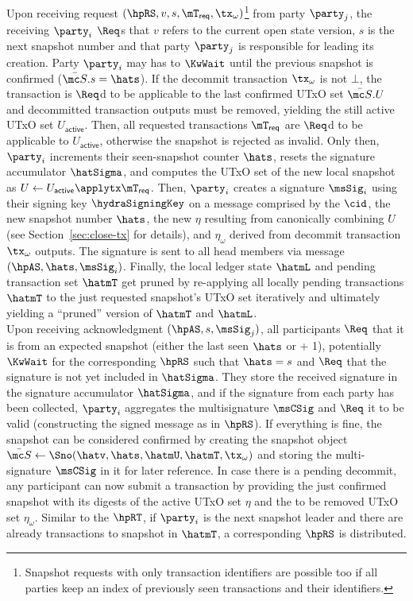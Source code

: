 \quad Upon receiving request
$(\hpRS,v,s,\mT_{\mathsf{req}}, \tx_{\omega})$\footnote{Snapshot requests
	with only transaction identifiers are possible too if all parties keep an
	index of previously seen transactions and their identifiers.} from party
$\party_j$, the receiving $\party_i$ $\Req$s that $v$ refers to the current
open state version, $s$ is the next snapshot number
and that party $\party_j$ is responsible for leading its creation. Party $\party_i$ may has to $\KwWait$ until the previous snapshot is
confirmed ($\bar{\mc S}.s = \hats$). If the decommit transaction $\tx_{\omega}$
is not $\bot$, the transaction is $\Req$d to be applicable to the last confirmed
UTxO set $\bar{\mc S}.U$ and decommitted transaction outputs must be removed, yielding the still
active UTxO set $U_{\mathsf{active}}$. Then, all requested transactions
$\mT_{\mathsf{req}}$ are $\Req$d to be applicable to $U_{\mathsf{active}}$,
otherwise the snapshot is rejected as invalid. Only then, $\party_i$ increments
their seen-snapshot counter $\hats$, resets the signature accumulator
$\hatSigma$, and computes the UTxO set of the new local snapshot as
$U \gets U_{\mathsf{active}} \applytx \mT_{\mathsf{req}}$. Then, $\party_i$
creates a signature $\msSig_i$ using their signing key $\hydraSigningKey$ on a
message comprised by the $\cid$, the new snapshot number $\hats$, the new $\eta$
resulting from canonically combining $U$ (see Section~\ref{sec:close-tx} for
details), and $\eta_{\omega}$ derived from decommit transaction $\tx_{\omega}$ outputs.
The signature is sent to all head members via message $(\hpAS,\hats,\msSig_i)$.
Finally, the local ledger state $\hatmL$ and pending transaction set $\hatmT$
get pruned by re-applying all locally pending transactions $\hatmT$ to the just
requested snapshot's UTxO set iteratively and
ultimately yielding a ``pruned'' version of $\hatmT$ and $\hatmL$. \\

\quad Upon receiving acknowledgment $(\hpAS,s,\msSig_j)$, all
participants $\Req$ that it is from an expected snapshot (either the last seen
$\hats$ or + 1), potentially $\KwWait$ for the corresponding $\hpRS$ such that
$\hats = s$ and $\Req$ that the signature is not yet included in $\hatSigma$.
They store the received signature in the signature accumulator $\hatSigma$, and
if the signature from each party has been collected, $\party_i$ aggregates the
multisignature $\msCSig$ and $\Req$ it to be valid (constructing the signed message
as in $\hpRS$). If everything is fine, the snapshot can be considered
confirmed by creating the snapshot object
$\bar{\mc S} \gets \Sno(\hatv, \hats, \hatmU, \hatmT , \tx_{\omega})$ and storing
the multi-signature $\msCSig$ in it for later reference. In case there is a pending
decommit, any participant can now submit a \mtxDecrement{} transaction by
providing the just confirmed snapshot with its digests of the active UTxO set
$\eta$ and the to be removed UTxO set $\eta_{\omega}$. Similar to the $\hpRT$, if
$\party_i$ is the next snapshot leader and there are already transactions to
snapshot in $\hatmT$, a corresponding $\hpRS$ is distributed.


